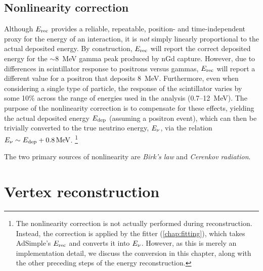 \documentclass[../thesis.tex]{subfiles}
\begin{document}
\subsection{Nonlinearity correction}
\label{sec:reconEnergyNL}

Although $E_\mathrm{rec}$ provides a reliable, repeatable, position- and time-independent
proxy for the energy of an interaction, it is \emph{not} simply linearly
proportional to the actual deposited energy. By construction, $E_\mathrm{rec}$ will
report the correct deposited energy for the $\sim$8~MeV gamma peak produced by
nGd capture. However, due to differences in scintillator response to positrons
versus gammas, $E_\mathrm{rec}$ will report a different value for a positron that
deposits 8~MeV. Furthermore, even when considering a single type of particle,
the response of the scintillator varies by some 10\% across the range of
energies used in the analysis (0.7--12~MeV). The purpose of the nonlinearity
correction is to compensate for these effects, yielding the actual deposited
energy $E_\mathrm{dep}$ (assuming a positron event), which can then be trivially
converted to the true neutrino energy, $E_\mathrm{\nu}$, via the relation $E_\mathrm{\nu} \sim E_\mathrm{dep}
+ \SI{0.8}{MeV}$. \footnote{The nonlinearity correction is not actually
  performed during reconstruction. Instead, the correction is applied by the
  fitter (\autoref{chap:fitting}), which takes AdSimple's $E_\mathrm{rec}$ and converts
  it into $E_\mathrm{\nu}$. However, as this is merely an implementation detail, we
  discuss the conversion in this chapter, along with the other preceding steps
  of the energy reconstruction.}

The two primary sources of nonlinearity are \emph{Birk's law} and \emph{Cerenkov
  radiation}.

\section{Vertex reconstruction}
\label{sec:reconVertex}
\end{document}
